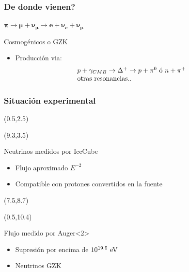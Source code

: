 \begin{frame}
 \frametitle{De donde vienen?}
 \begin{alertblock}{}
  \centering
  $\bm{\pi\rightarrow\mu+\nu_\mu\rightarrow e + \nu_e + \nu_\mu}$
 \end{alertblock}
 \begin{block}{Cosmog\'enicos o GZK}
  \begin{itemize}
   \item Producci\'on via:
   \begin{displaymath}
    \begin{array}{l}
		p + \gamma_{CMB} \rightarrow \Delta^{+} \rightarrow p +\pi^{0}\,\,{\rm \acute{o}}\,\, n +\pi^{+} \\
        {\rm otras\,\, resonancias..}
	\end{array}
   \end{displaymath}
  \end{itemize}
 \end{block}
 \vfill
 \begin{center}
 \end{center}
 \vfill
\end{frame}

\begin{frame}
 \frametitle{Situaci\'on experimental}
 \begin{textblock}{8}(0.5,2.5)
 \end{textblock}
 \begin{textblock}{6}(9.3,3.5)
  \begin{exampleblock}{Neutrinos medidos por IceCube}
   \begin{itemize}
    \item Flujo aproximado $E^{-2}$
    \item Compatible con protones convertidos en la fuente
   \end{itemize}
  \end{exampleblock}
 \end{textblock}

 \begin{textblock}{8}(7.5,8.7)
 \end{textblock}
 
 \begin{textblock}{6}(0.5,10.4)
  \begin{alertblock}{Flujo medido por Auger}<2>
   \begin{itemize}
    \item Supresi\'on por encima de $10^{19.5}{\rm\ eV}$
    \item Neutrinos GZK
   \end{itemize}
  \end{alertblock}
 \end{textblock}
\end{frame}

